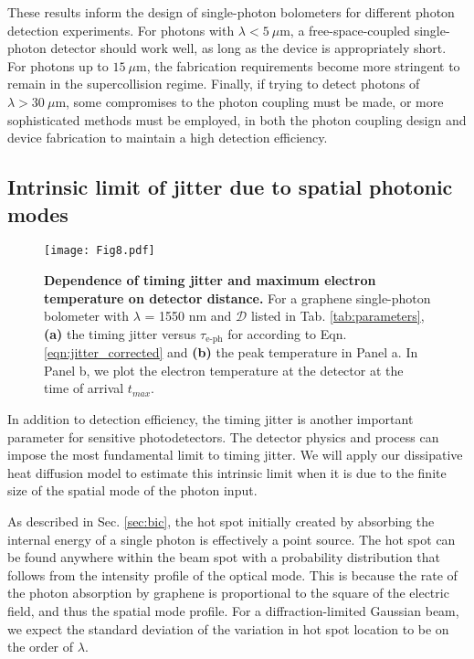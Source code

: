 \documentclass[aip, amsmath,amssymb, reprint]{revtex4-1}
\begin{document}
These results inform the design of single-photon bolometers for different photon detection experiments. For photons with $\lambda < 5~\mu$m, a free-space-coupled single-photon detector should work well, as long as the device is appropriately short. For photons up to $15~\mu$m, the fabrication requirements become more stringent to remain in the supercollision regime. Finally, if trying to detect photons of $\lambda > 30~\mu$m, some compromises to the photon coupling must be made, or more sophisticated methods must be employed, in both the photon coupling design and device fabrication to maintain a high detection efficiency.

\subsection{Intrinsic limit of jitter due to spatial photonic modes}
\begin{figure}[t]%
\texttt{[image: Fig8.pdf]}
\caption{\textbf{Dependence of timing jitter and maximum electron temperature on detector distance.} For a graphene single-photon bolometer with $\lambda$ = 1550 nm and $\mathcal{D}$ listed in Tab. \ref{tab:parameters}, \textbf{(a)} the timing jitter versus $\tau_{\text{e-ph}}$ for according to Eqn. \ref{eqn:jitter_corrected} and \textbf{(b)} the peak temperature in Panel a. In Panel b, we plot the electron temperature at the detector at the time of arrival $t_{max}$.}
\label{fig:jitter}
\end{figure}
In addition to detection efficiency, the timing jitter is another important parameter for sensitive photodetectors. The detector physics and process can impose the most fundamental limit to timing jitter\cite{Allmaras.2019}. We will apply our dissipative heat diffusion model to estimate this intrinsic limit when it is due to the finite size of the spatial mode of the photon input\cite{Korzh.2020}.

As described in Sec. \ref{sec:bic}, the hot spot initially created by absorbing the internal energy of a single photon is effectively a point source. The hot spot can be found anywhere within the beam spot with a probability distribution that follows from the intensity profile of the optical mode. This is because the rate of the photon absorption by graphene is proportional to the square of the electric field, and thus the spatial mode profile. For a diffraction-limited Gaussian beam, we expect the standard deviation of the variation in hot spot location to be on the order of $\lambda$.
\end{document}
